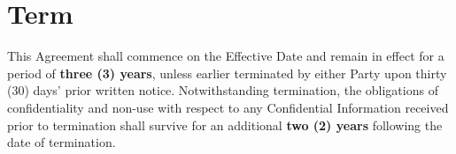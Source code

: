 \section{Term}

\noindent
This Agreement shall commence on the Effective Date and remain in effect for a
period of \textbf{three (3) years}, unless earlier terminated by either Party
upon thirty (30) days' prior written notice. Notwithstanding termination, the
obligations of confidentiality and non-use with respect to any Confidential
Information received prior to termination shall survive for an additional
\textbf{two (2) years} following the date of termination.
